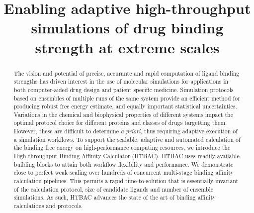 \documentclass{llncs}
\title{Enabling adaptive high-throughput simulations of drug binding strength at extreme scales}
\begin{document}
\maketitle





\begin{abstract}

The vision and potential of precise, accurante and rapid computation of ligand
binding strengths has driven interest in the use of molecular simulations for
applications in both computer-aided drug design and patient specific medicine.
Simulation protocols based on ensembles of multiple runs of the same system
provide an efficient method for producing robust free energy estimate, and
equally important statistical uncertainties. Variations in the chemical and
biophysical properties of different systems impact the optimal protocol choice
for different proteins and classes of drugs targetting them. However, these
are difficult to determine {\it a priori}, thus requiring adaptive execution
of a simulation workflows. To support the scalable, adaptive and automated
calculation of the binding free energy on high-performance computing
resources, we introduce the High-throughput Binding Affinity Calculator
(HTBAC). HTBAC uses readily available building blocks to attain both workflow
flexibility and performance. We demonstrate close to perfect weak scaling over
hundreds of concurrent multi-stage binding affinity calculation pipelines.
This permits a rapid time-to-solution that is essentially invariant of the
calculation protocol, size of candidate ligands and number of ensemble
simulations. As such, HTBAC advances the state of the art of binding affinity
calculations and protocols.
\end{abstract}
\end{document}
